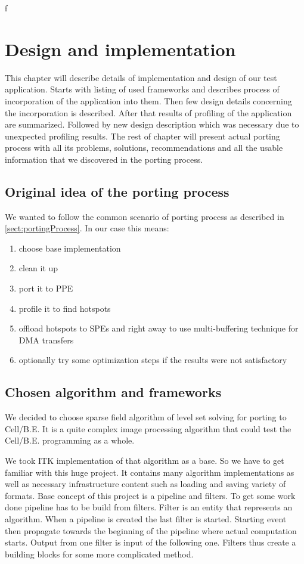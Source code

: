 f\chapter{Design and implementation}

This chapter will describe details of implementation and design of our test application.
Starts with listing of used frameworks and describes process of incorporation of the application into them.
Then few design details concerning the incorporation is described.
After that results of profiling of the application are summarized.
Followed by new design description which was necessary due to unexpected profiling results.
The rest of chapter will present actual porting process with all its problems, solutions, recommendations and all the usable information that we discovered in the porting process.

\section{Original idea of the porting process}

We wanted to follow the common scenario of porting process as described in \ref{sect:portingProcess}.
In our case this means:
\begin{enumerate}
\item{choose base implementation}
\item{clean it up}
\item{port it to PPE}
\item{profile it to find hotspots}
\item{offload hotspots to SPEs and right away to use multi-buffering technique for DMA transfers}
\item{optionally try some optimization steps if the results were not satisfactory}
\end{enumerate}

\section{Chosen algorithm and frameworks}

\par
We decided to choose sparse field algorithm of level set solving for porting to Cell/B.E.
It is a quite complex image processing algorithm that could test the Cell/B.E. programming as a whole.

\par
We took ITK \cite{itk} implementation of that algorithm as a base.
So we have to get familiar with this huge project.
It contains many algorithm implementations as well as necessary infrastructure content such as loading and saving variety of formats.
Base concept of this project is a pipeline and filters.
To get some work done pipeline has to be build from filters.
Filter is an entity that represents an algorithm.
When a pipeline is created the last filter is started.
Starting event then propagate towards the beginning of the pipeline where actual computation starts.
Output from one filter is input of the following one.
Filters thus create a building blocks for some more complicated method.


